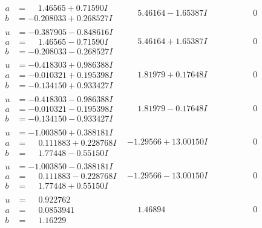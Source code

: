 \documentclass[1p]{elsarticle_modified}
\theoremstyle{definition}
\begin{document}
$$\begin{array}{c|c|c}
\begin{aligned}
a &= \phantom{-}1.46565 + 0.71590 I \\
b &= -0.208033 + 0.268527 I\end{aligned}
 & \phantom{-}5.46164 - 1.65387 I & \phantom{-0.000000 } 0 \\ \hline\begin{aligned}
u &= -0.387905 - 0.848616 I \\
a &= \phantom{-}1.46565 - 0.71590 I \\
b &= -0.208033 - 0.268527 I\end{aligned}
 & \phantom{-}5.46164 + 1.65387 I & \phantom{-0.000000 } 0 \\ \hline\begin{aligned}
u &= -0.418303 + 0.986388 I \\
a &= -0.010321 + 0.195398 I \\
b &= -0.134150 + 0.933427 I\end{aligned}
 & \phantom{-}1.81979 + 0.17648 I & \phantom{-0.000000 } 0 \\ \hline\begin{aligned}
u &= -0.418303 - 0.986388 I \\
a &= -0.010321 - 0.195398 I \\
b &= -0.134150 - 0.933427 I\end{aligned}
 & \phantom{-}1.81979 - 0.17648 I & \phantom{-0.000000 } 0 \\ \hline\begin{aligned}
u &= -1.003850 + 0.388181 I \\
a &= \phantom{-}0.111883 + 0.228768 I \\
b &= \phantom{-}1.77448 - 0.55150 I\end{aligned}
 & -1.29566 + 13.00150 I & \phantom{-0.000000 } 0 \\ \hline\begin{aligned}
u &= -1.003850 - 0.388181 I \\
a &= \phantom{-}0.111883 - 0.228768 I \\
b &= \phantom{-}1.77448 + 0.55150 I\end{aligned}
 & -1.29566 - 13.00150 I & \phantom{-0.000000 } 0 \\ \hline\begin{aligned}
u &= \phantom{-}0.922762\phantom{ +0.000000I} \\
a &= \phantom{-}0.0853941\phantom{ +0.000000I} \\
b &= \phantom{-}1.16229\phantom{ +0.000000I}\end{aligned}
 & \phantom{-}1.46894\phantom{ +0.000000I} & \phantom{-0.000000 } 0 \\ \hline\begin{aligned}

\end{aligned}
\end{array}$$
\end{document}
